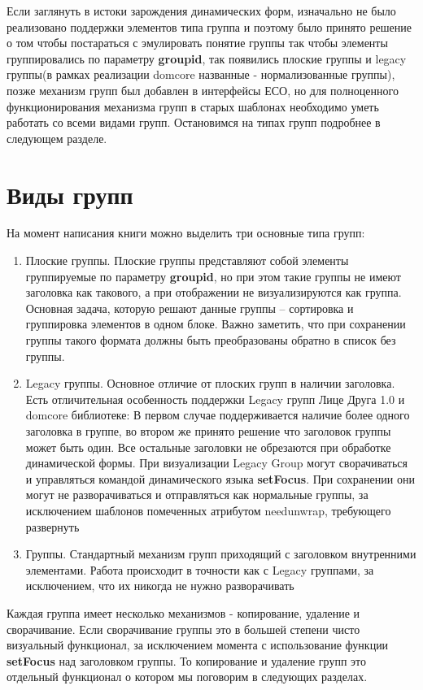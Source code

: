 \documentclass[../index.tex]{subfiles}
\begin{document}
Если заглянуть в истоки зарождения динамических форм, изначально не было реализовано поддержки элементов типа группа и поэтому было принято решение о том чтобы постараться с эмулировать понятие группы так чтобы элементы группировались по параметру \textbf{groupid}, так появились плоские группы и legacy группы(в рамках реализации domcore названные - нормализованные группы), позже механизм групп был добавлен в интерфейсы ЕСО, но для полноценного функционирования механизма групп в старых шаблонах необходимо уметь работать со всеми видами групп. Остановимся на типах групп подробнее в следующем разделе.
\section{Виды групп}
    На момент написания книги можно выделить три основные типа групп:
\begin{enumerate}
    \item Плоские группы. Плоские группы представляют собой элементы группируемые по параметру \textbf{groupid}, но при этом такие группы не имеют заголовка как такового, а при отображении не визуализируются как группа. Основная задача, которую решают данные группы -- сортировка и группировка элементов в одном блоке. Важно заметить, что при сохранении группы такого формата должны быть преобразованы обратно в список без группы.
    \item Legacy группы. Основное отличие от плоских групп в наличии заголовка. Есть отличительная особенность поддержки Legacy групп Лице Друга 1.0 и domcore библиотеке: В первом случае поддерживается наличие более одного заголовка в группе, во втором же принято решение что заголовок группы может быть один. Все остальные заголовки не обрезаются при обработке динамической формы. При визуализации Legacy Group могут сворачиваться и управляться командой динамического языка \textbf{setFocus}. При сохранении они могут не разворачиваться и отправляться как нормальные группы, за исключением шаблонов помеченных атрибутом needunwrap, требующего развернуть
    \item Группы. Стандартный механизм групп приходящий с заголовком внутренними элементами. Работа происходит в точности как с Legacy группами, за исключением, что их никогда не нужно разворачивать
\end{enumerate}
    Каждая группа имеет несколько механизмов - копирование, удаление и сворачивание. Если сворачивание группы это в большей степени чисто визуальный функционал, за исключением момента с использование функции \textbf{setFocus} над  заголовком группы. То копирование и удаление групп это отдельный функционал о котором мы поговорим в следующих разделах.
\end{document}
